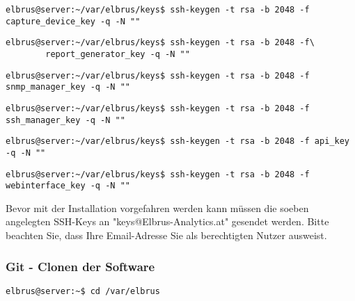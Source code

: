 \documentclass{article}
\begin{document}
	\begin{lstlisting}[caption={Erstellen des SSH-keys der für das Herunterladen des 'Capture-Device' benötigt wird.}]
		elbrus@server:~/var/elbrus/keys$ ssh-keygen -t rsa -b 2048 -f capture_device_key -q -N ""
	\end{lstlisting}

	\begin{lstlisting}[caption={Erstellen des SSH-keys der für das Herunterladen des 'Report-Generator' benötigt wird.}]
		elbrus@server:~/var/elbrus/keys$ ssh-keygen -t rsa -b 2048 -f\
		report_generator_key -q -N ""
	\end{lstlisting}

	\begin{lstlisting}[caption={Erstellen des SSH-keys der für das Herunterladen des 'SNMP-Managers' benötigt wird.}]
		elbrus@server:~/var/elbrus/keys$ ssh-keygen -t rsa -b 2048 -f snmp_manager_key -q -N ""
	\end{lstlisting}

	\begin{lstlisting}[caption={Erstellen des SSH-keys der für das Herunterladen des 'SSH-Managers' benötigt wird.}]
		elbrus@server:~/var/elbrus/keys$ ssh-keygen -t rsa -b 2048 -f ssh_manager_key -q -N ""
	\end{lstlisting}
	
	\begin{lstlisting}[caption={Erstellen des SSH-keys der für das Herunterladen der 'API' benötigt wird.}]
		elbrus@server:~/var/elbrus/keys$ ssh-keygen -t rsa -b 2048 -f api_key -q -N ""
	\end{lstlisting}
	
	\begin{lstlisting}[caption={Erstellen des SSH-keys der für das Herunterladen des 'Webinterfaces' benötigt wird.}]
		elbrus@server:~/var/elbrus/keys$ ssh-keygen -t rsa -b 2048 -f webinterface_key -q -N ""
	\end{lstlisting}
	Bevor mit der Installation vorgefahren werden kann müssen die soeben angelegten SSH-Keys an "keys@Elbrus-Analytics.at" gesendet werden. Bitte beachten Sie, dass Ihre Email-Adresse Sie als berechtigten Nutzer ausweist.
	
	\subsubsection{Git - Clonen der Software}
	\begin{lstlisting}[caption={Wechseln des Verzeichnisses.}]
		elbrus@server:~$ cd /var/elbrus
	\end{lstlisting}
	
\end{document}
